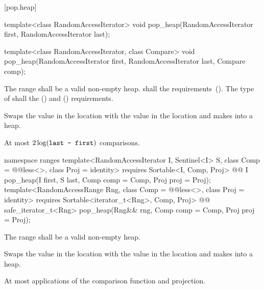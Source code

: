 [pop.heap]{}

%
\begin{itemdecl}
template<class RandomAccessIterator>
  void pop_heap(RandomAccessIterator first, RandomAccessIterator last);

template<class RandomAccessIterator, class Compare>
  void pop_heap(RandomAccessIterator first, RandomAccessIterator last,
                Compare comp);
\end{itemdecl}

\begin{itemdescr}
\pnum
\requires
The range
shall be a valid non-empty heap.
 shall   the
 requirements~(). The type
of  shall   the
 () and
 () requirements.

\pnum
\effects
Swaps the value in the location 
with the value in the location
and makes
into a heap.

\pnum
\complexity
At most
$2 \log(\texttt{last - first})$
comparisons.
\end{itemdescr}

\begin{addedblock}
%
\begin{itemdecl}
namespace ranges {
  template<RandomAccessIterator I, Sentinel<I> S, class Comp = @@less<>,
      class Proj = identity>
    requires Sortable<I, Comp, Proj>
    @@ I
      pop_heap(I first, S last, Comp comp = Comp{}, Proj proj = Proj{});
  template<RandomAccessRange Rng, class Comp = @@less<>, class Proj = identity>
    requires Sortable<iterator_t<Rng>, Comp, Proj>
    @@ safe_iterator_t<Rng>
      pop_heap(Rng&& rng, Comp comp = Comp{}, Proj proj = Proj{});
}
\end{itemdecl}

\begin{itemdescr}
\pnum
\requires
The range
shall be a valid non-empty heap.

\pnum
\effects
Swaps the value in the location 
with the value in the location
and makes
into a heap.

\pnum
\returns {}

\pnum
\complexity
At most
applications of the comparison function and projection.
\end{itemdescr}
\end{addedblock}

